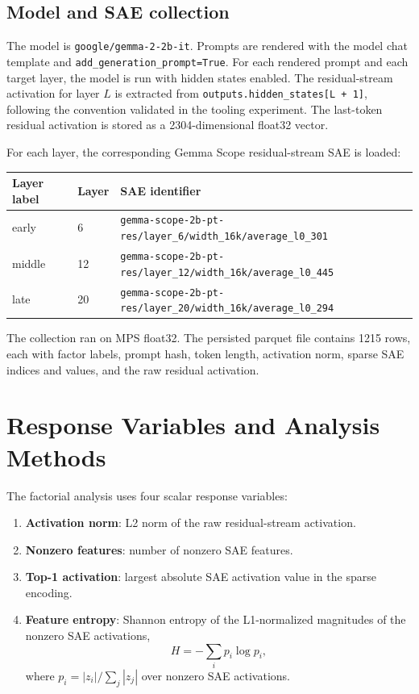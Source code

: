 \documentclass[11pt]{article}
\begin{document}
\subsection{Model and SAE collection}

The model is \texttt{google/gemma-2-2b-it}. Prompts are rendered with the model chat template and \texttt{add\_generation\_prompt=True}. For each rendered prompt and each target layer, the model is run with hidden states enabled. The residual-stream activation for layer $L$ is extracted from \texttt{outputs.hidden\_states[L + 1]}, following the convention validated in the tooling experiment. The last-token residual activation is stored as a 2304-dimensional float32 vector.

For each layer, the corresponding Gemma Scope residual-stream SAE is loaded:

\begin{center}
\begin{tabular}{lll}
\toprule
Layer label & Layer & SAE identifier \\
\midrule
early & 6 & \texttt{gemma-scope-2b-pt-res/layer\_6/width\_16k/average\_l0\_301} \\
middle & 12 & \texttt{gemma-scope-2b-pt-res/layer\_12/width\_16k/average\_l0\_445} \\
late & 20 & \texttt{gemma-scope-2b-pt-res/layer\_20/width\_16k/average\_l0\_294} \\
\bottomrule
\end{tabular}
\end{center}

The collection ran on MPS float32. The persisted parquet file contains 1215 rows, each with factor labels, prompt hash, token length, activation norm, sparse SAE indices and values, and the raw residual activation.

\section{Response Variables and Analysis Methods}

The factorial analysis uses four scalar response variables:

\begin{enumerate}
    \item \textbf{Activation norm}: L2 norm of the raw residual-stream activation.
    \item \textbf{Nonzero features}: number of nonzero SAE features.
    \item \textbf{Top-1 activation}: largest absolute SAE activation value in the sparse encoding.
    \item \textbf{Feature entropy}: Shannon entropy of the L1-normalized magnitudes of the nonzero SAE activations,
    \[
        H = -\sum_i p_i \log p_i,
    \]
    where $p_i = |z_i| / \sum_j |z_j|$ over nonzero SAE activations.
\end{enumerate}
\end{document}
